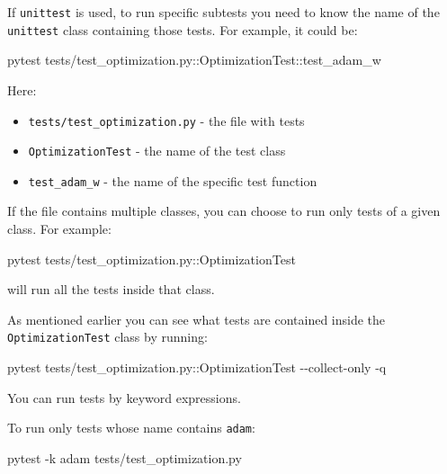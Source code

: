 \documentclass[
]{report}
\newenvironment{Shaded}{\begin{snugshade}}{\end{snugshade}}
\newcommand{\AttributeTok}[1]{\textcolor[rgb]{0.40,0.45,0.13}{#1}}
\newcommand{\ExtensionTok}[1]{\textcolor[rgb]{0.00,0.23,0.31}{#1}}
\newcommand{\NormalTok}[1]{\textcolor[rgb]{0.00,0.23,0.31}{#1}}
\providecommand{\tightlist}{%
  \setlength{\itemsep}{0pt}\setlength{\parskip}{0pt}}\usepackage{longtable,booktabs,array}
\begin{document}
If \texttt{unittest} is used, to run specific subtests you need to know
the name of the \texttt{unittest} class containing those tests. For
example, it could be:

\begin{Shaded}
\begin{Highlighting}[]
\ExtensionTok{pytest}\NormalTok{ tests/test\_optimization.py::OptimizationTest::test\_adam\_w}
\end{Highlighting}
\end{Shaded}

Here:

\begin{itemize}
\tightlist
\item
  \texttt{tests/test\_optimization.py} - the file with tests
\item
  \texttt{OptimizationTest} - the name of the test class
\item
  \texttt{test\_adam\_w} - the name of the specific test function
\end{itemize}

If the file contains multiple classes, you can choose to run only tests
of a given class. For example:

\begin{Shaded}
\begin{Highlighting}[]
\ExtensionTok{pytest}\NormalTok{ tests/test\_optimization.py::OptimizationTest}
\end{Highlighting}
\end{Shaded}

will run all the tests inside that class.

As mentioned earlier you can see what tests are contained inside the
\texttt{OptimizationTest} class by running:

\begin{Shaded}
\begin{Highlighting}[]
\ExtensionTok{pytest}\NormalTok{ tests/test\_optimization.py::OptimizationTest }\AttributeTok{{-}{-}collect{-}only} \AttributeTok{{-}q}
\end{Highlighting}
\end{Shaded}

You can run tests by keyword expressions.

To run only tests whose name contains \texttt{adam}:

\begin{Shaded}
\begin{Highlighting}[]
\ExtensionTok{pytest} \AttributeTok{{-}k}\NormalTok{ adam tests/test\_optimization.py}
\end{Highlighting}
\end{Shaded}
\end{document}
